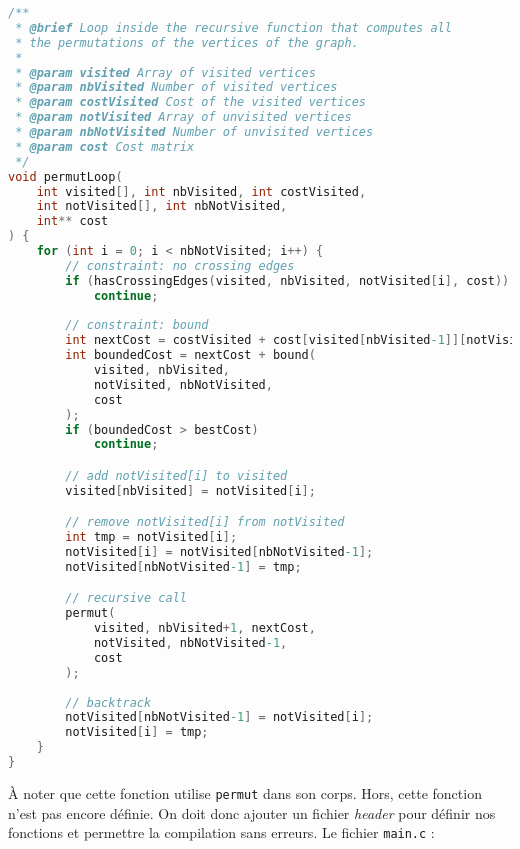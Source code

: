 \begin{lstlisting}[language=C, caption={Boucle de permutation dans la fonction récursive \texttt{permut}.}]
/**
 * @brief Loop inside the recursive function that computes all 
 * the permutations of the vertices of the graph.
 * 
 * @param visited Array of visited vertices
 * @param nbVisited Number of visited vertices
 * @param costVisited Cost of the visited vertices
 * @param notVisited Array of unvisited vertices
 * @param nbNotVisited Number of unvisited vertices
 * @param cost Cost matrix
 */
void permutLoop(
    int visited[], int nbVisited, int costVisited,
    int notVisited[], int nbNotVisited,
    int** cost
) {
    for (int i = 0; i < nbNotVisited; i++) {
        // constraint: no crossing edges
        if (hasCrossingEdges(visited, nbVisited, notVisited[i], cost))
            continue;
  
        // constraint: bound
        int nextCost = costVisited + cost[visited[nbVisited-1]][notVisited[i]];
        int boundedCost = nextCost + bound(
            visited, nbVisited, 
            notVisited, nbNotVisited,
            cost
        );
        if (boundedCost > bestCost)
            continue;

        // add notVisited[i] to visited
        visited[nbVisited] = notVisited[i];

        // remove notVisited[i] from notVisited
        int tmp = notVisited[i];
        notVisited[i] = notVisited[nbNotVisited-1];
        notVisited[nbNotVisited-1] = tmp;

        // recursive call
        permut(
            visited, nbVisited+1, nextCost,
            notVisited, nbNotVisited-1,
            cost  
        );
  
        // backtrack
        notVisited[nbNotVisited-1] = notVisited[i];
        notVisited[i] = tmp;
    }
}
\end{lstlisting}

À noter que cette fonction utilise \texttt{permut} dans son corps. Hors, cette fonction n'est pas encore définie. On doit donc ajouter un fichier \textit{header} pour définir nos fonctions et permettre la compilation sans erreurs. Le fichier \texttt{main.c} :

